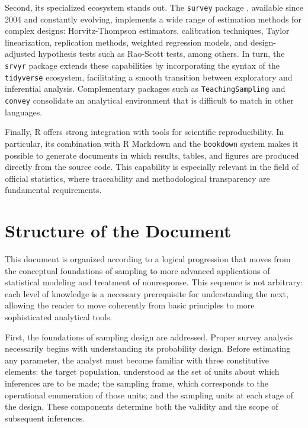 \documentclass[
  english,
  12pt,
]{book}
\begin{document}
Second, its specialized ecosystem stands out. The \texttt{survey} package \citep{Lumley2024}, available since 2004 and constantly evolving, implements a wide range of estimation methods for complex designs: Horvitz-Thompson estimators, calibration techniques, Taylor linearization, replication methods, weighted regression models, and design-adjusted hypothesis tests such as Rao-Scott tests, among others. In turn, the \texttt{srvyr} package \citep{Freedman2024} extends these capabilities by incorporating the syntax of the \texttt{tidyverse} ecosystem, facilitating a smooth transition between exploratory and inferential analysis. Complementary packages such as \texttt{TeachingSampling} \citep{GutierrezT2020} and \texttt{convey} \citep{convey2024} consolidate an analytical environment that is difficult to match in other languages.

Finally, R offers strong integration with tools for scientific reproducibility. In particular, its combination with R Markdown and the \texttt{bookdown} system makes it possible to generate documents in which results, tables, and figures are produced directly from the source code. This capability is especially relevant in the field of official statistics, where traceability and methodological transparency are fundamental requirements.

\section{Structure of the Document}\label{structure-of-the-document}

This document is organized according to a logical progression that moves from the conceptual foundations of sampling to more advanced applications of statistical modeling and treatment of nonresponse. This sequence is not arbitrary: each level of knowledge is a necessary prerequisite for understanding the next, allowing the reader to move coherently from basic principles to more sophisticated analytical tools.

First, the foundations of sampling design are addressed. Proper survey analysis necessarily begins with understanding its probability design. Before estimating any parameter, the analyst must become familiar with three constitutive elements: the target population, understood as the set of units about which inferences are to be made; the sampling frame, which corresponds to the operational enumeration of those units; and the sampling units at each stage of the design. These components determine both the validity and the scope of subsequent inferences.
\end{document}
